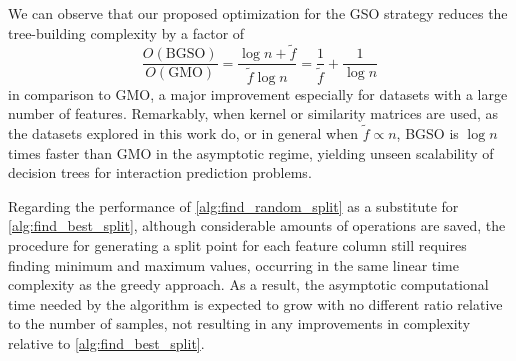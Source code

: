 We can observe that our proposed optimization for the GSO strategy reduces the tree-building complexity by a factor of
%
\begin{equation}
    \frac{O(\text{BGSO})}{O(\text{GMO})}
        = \frac{\log n + \tilde f} {\tilde f \log n}
        = \frac{1}{\tilde f} + \frac{1}{\log n}
    \label{eq:O_reduction}
\end{equation}
%
in comparison to GMO, a major improvement especially for datasets with a large number of features. Remarkably, when kernel or similarity matrices are used, as the datasets explored in this work do, or in general when $\tilde f \propto n$, BGSO is $\log n$ times faster than GMO in the asymptotic regime, yielding unseen scalability of decision trees for interaction prediction problems.

Regarding the performance of \ref{alg:find_random_split} as a substitute for \ref{alg:find_best_split}, although considerable amounts of operations are saved, the procedure for generating a split point for each feature column still requires finding minimum and maximum values, occurring in the same linear time complexity as the greedy approach.
%
As a result, the asymptotic computational time needed by the algorithm is expected to grow with no different ratio relative to the number of samples, not resulting in any improvements in complexity relative to \ref{alg:find_best_split}.

